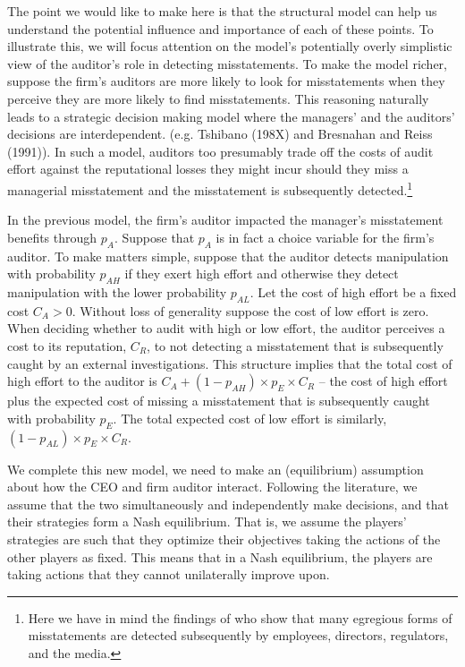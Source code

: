 The point we would like to make here is that the structural model can help us understand
the potential influence and importance of each of these points. To illustrate this,
we will focus attention on the model's potentially overly simplistic view of the
auditor's role in detecting misstatements.  To make the model richer, suppose the firm's 
auditors are more likely to look for misstatements when they perceive
they are more likely to find misstatements. This reasoning naturally
leads to a strategic decision making model where the managers' and the auditors' decisions are
interdependent. (e.g. Tshibano (198X) and Bresnahan and Reiss (1991)).
In such a model, auditors too presumably trade off the costs of audit effort against the
reputational losses they might incur should they miss a managerial misstatement and the misstatement is 
subsequently detected.\footnote{Here we have in mind the findings of \citet{Dyck:2010kh} who show that 
many egregious forms of misstatements are detected subsequently by employees, directors, 
regulators, and the media.} 

In the previous model, the firm's auditor impacted the manager's
misstatement benefits through $p_A$. Suppose that $p_A$ is in fact a choice variable for
the firm's auditor. To make matters simple, suppose that the auditor
detects manipulation with probability $p_{AH}$ if they exert high effort and 
otherwise they detect manipulation with the lower probability $p_{AL}$. 
Let the cost of high effort be a fixed cost $C_A > 0$. Without loss of generality
suppose the cost of low effort is zero. When deciding whether to audit with
high or low effort, the auditor perceives a cost to its reputation, $C_R$, 
to not detecting a misstatement that is subsequently caught by an external investigations. 
This structure implies that the total cost of high effort to the auditor is $C_A + (1-p_{AH}) \times 
p_E \times C_R$ -- the cost of high effort plus the expected cost of missing 
a misstatement that is subsequently caught with probability $p_E$. The total expected cost of
low effort is similarly, $(1-p_{AL}) \times p_E \times C_R$. 

We complete this new model, we need to make an (equilibrium) assumption about how the CEO and
firm auditor interact. Following the literature, we assume that the two simultaneously
and independently make decisions, and that their strategies form a Nash equilibrium.
That is, we assume the players' strategies are such that they optimize their objectives 
taking the actions of the other players as fixed. This means that in a Nash equilibrium, 
the players are taking actions that they cannot unilaterally improve upon.


